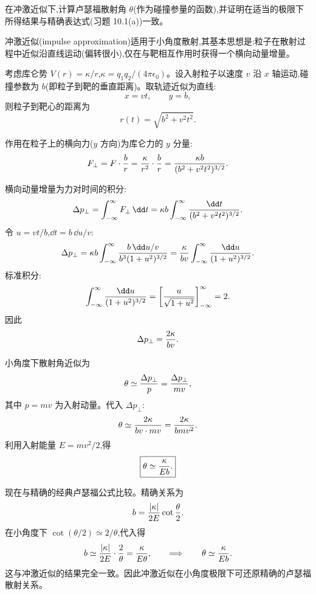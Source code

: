 \begin{question}
在冲激近似下,计算卢瑟福散射角 $\theta$(作为碰撞参量的函数),并证明在适当的极限下所得结果与精确表达式(习题 10.1(a))一致。
\begin{solution}
冲激近似(impulse approximation)适用于小角度散射,其基本思想是:粒子在散射过程中近似沿直线运动(偏转很小),仅在与靶相互作用时获得一个横向动量增量。

考虑库仑势 $V(r)=\kappa/r$,$\kappa=q_1q_2/(4\pi\epsilon_0)$。设入射粒子以速度 $v$ 沿 $x$ 轴运动,碰撞参数为 $b$(即粒子到靶的垂直距离)。取轨迹近似为直线:
\[
x=vt,\qquad y=b,
\]
则粒子到靶心的距离为
\[
r(t)=\sqrt{b^2+v^2t^2}.
\]

作用在粒子上的横向力($y$ 方向)为库仑力的 $y$ 分量:
\[
F_\perp=F\cdot{b\over r}
={\kappa\over r^2}\cdot{b\over r}
={\kappa b\over(b^2+v^2t^2)^{3/2}}.
\]

横向动量增量为力对时间的积分:
\[
\Delta p_\perp=\int_{-\infty}^{\infty}F_\perp\,\dd t
=\kappa b\int_{-\infty}^{\infty}{\dd t\over(b^2+v^2t^2)^{3/2}}.
\]
令 $u=vt/b$,$\dd t=b\,\dd u/v$:
\[
\Delta p_\perp=\kappa b\int_{-\infty}^{\infty}{b\,\dd u/v\over b^3(1+u^2)^{3/2}}
={\kappa\over bv}\int_{-\infty}^{\infty}{\dd u\over(1+u^2)^{3/2}}.
\]
标准积分:
\[
\int_{-\infty}^{\infty}{\dd u\over(1+u^2)^{3/2}}
=\left[{u\over\sqrt{1+u^2}}\right]_{-\infty}^{\infty}=2.
\]
因此
\[
\Delta p_\perp={2\kappa\over bv}.
\]

小角度下散射角近似为
\[
\theta\simeq{\Delta p_\perp\over p}={\Delta p_\perp\over mv},
\]
其中 $p=mv$ 为入射动量。代入 $\Delta p_\perp$:
\[
\theta\simeq{2\kappa\over bv\cdot mv}={2\kappa\over bmv^2}.
\]
利用入射能量 $E=mv^2/2$,得
\[
\boxed{\theta\simeq{\kappa\over Eb}.}
\]

现在与精确的经典卢瑟福公式比较。精确关系为
\[
b={|\kappa|\over2E}\cot{\theta\over2}.
\]
在小角度下 $\cot(\theta/2)\simeq 2/\theta$,代入得
\[
b\simeq{|\kappa|\over2E}\cdot{2\over\theta}={\kappa\over E\theta},
\qquad\Longrightarrow\qquad\theta\simeq{\kappa\over Eb}.
\]
这与冲激近似的结果完全一致。因此冲激近似在小角度极限下可还原精确的卢瑟福散射关系。
\end{solution}
\end{question}

